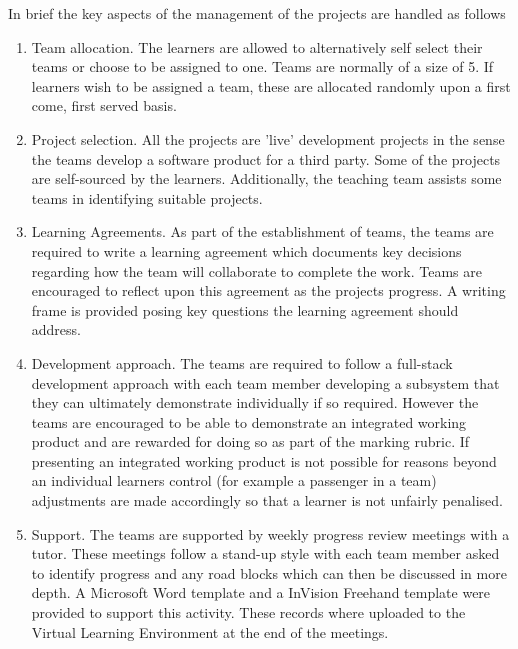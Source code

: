 \documentclass[sigconf, anonymous=true]{acmart}
\begin{document}
In brief the key aspects of the management of the projects are handled as follows
\begin{enumerate}
    \item {Team allocation.}
The learners are allowed to alternatively self select their teams or choose to be assigned to one. Teams are normally of a size of 5. If learners wish to be assigned a team, these are allocated randomly upon a first come, first served basis. 
\item {Project selection.}
All the projects are 'live' development projects in the sense the teams develop a software product for a third party. Some of the projects are self-sourced by the learners. Additionally, the teaching team assists some teams in identifying suitable projects. 
\item{Learning Agreements.}
As part of the establishment of teams, the teams are required to write a learning agreement which documents key decisions regarding how the team will collaborate to complete the work. Teams are encouraged to reflect upon this agreement as the projects progress. A writing frame is provided posing key questions the learning agreement should address. 
\item{Development approach.}
The teams are required to follow a full-stack development approach with each team member developing a subsystem that they can ultimately demonstrate individually if so required. However the teams are encouraged to be able to demonstrate an integrated working product and are rewarded for doing so as part of the marking rubric. If presenting an integrated working product is not possible for reasons beyond an individual learners control (for example a passenger in a team) adjustments are made accordingly so that a learner is not unfairly penalised.
\item{Support.}
The teams are supported by weekly progress review meetings with a tutor. These meetings follow a stand-up style with each team member asked to identify progress and any road blocks which can then be discussed in more depth. A Microsoft Word template and a InVision Freehand \cite{InVision} template were provided to support this activity. These records where uploaded to the Virtual Learning Environment at the end of the meetings.


\end{enumerate}
\end{document}
